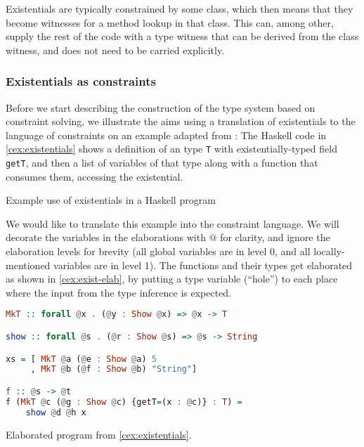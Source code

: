 Existentials are typically constrained by some class, which then means that they become witnesses for a method lookup in that class. This can, among other, supply the rest of the code with a type witness that can be derived from the class witness, and does not need to be carried explicitly.

\subsubsection{Existentials as constraints}

Before we start describing the construction of the type system based on constraint solving, we illustrate the aims using a translation of existentials to the language of constraints on an example adapted from \citet{peytonjones2019type}:
The Haskell code in \cref{cex:existentials} shows a definition of an type \lstinline{T} with existentially-typed field \lstinline{getT}, and then a list of variables of that type along with a function that consumes them, accessing the existential.

\begin{codex}

\caption{Example use of existentials in a Haskell program}
\label{cex:existentials}
\end{codex}

We would like to translate this example into the constraint language. We will decorate the variables in the elaborations with $@$ for clarity, and ignore the elaboration levels for brevity (all global variables are in level 0, and all locally-mentioned variables are in level 1). The functions and their types get elaborated as shown in \cref{cex:exist-elab}, by putting a type variable (``hole'') to each place where the input from the type inference is expected.

\begin{codex}
\begin{lstlisting}[language=Haskell]
MkT :: forall @x . (@y : Show @x) => @x -> T

show :: forall @s . (@r : Show @s) => @s -> String

xs = [ MkT @a (@e : Show @a) 5
     , MkT @b (@f : Show @b) "String"]

f :: @s -> @t
f (MkT @c (@g : Show @c) {getT=(x : @c)} : T) =
    show @d @h x
\end{lstlisting}
\caption{Elaborated program from \cref{cex:existentials}.}
\label{cex:exist-elab}
\end{codex}

